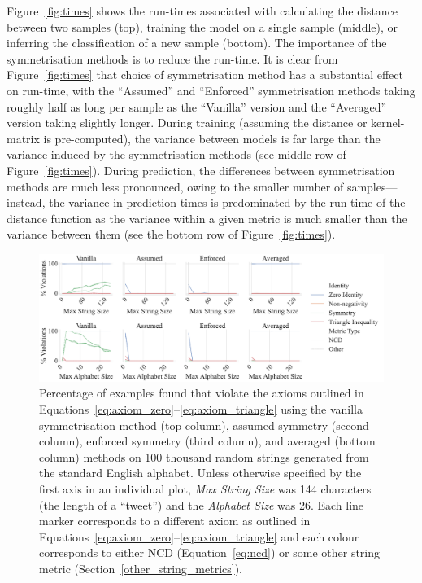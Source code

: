 \documentclass[preprint,12pt]{article}
\begin{document}
Figure~\ref{fig:times} shows the run-times associated with calculating the distance between two samples (top), training the model on a single sample (middle), or inferring the classification of a new sample (bottom).
The importance of the symmetrisation methods is to reduce the run-time.
It is clear from Figure~\ref{fig:times} that choice of symmetrisation method has a substantial effect on run-time, with the ``Assumed'' and ``Enforced'' symmetrisation methods taking roughly half as long per sample as the ``Vanilla'' version and the ``Averaged'' version taking slightly longer.
During training (assuming the distance or kernel-matrix is pre-computed), the variance between models is far large than the variance induced by the symmetrisation methods (see middle row of Figure~\ref{fig:times}).
During prediction, the differences between symmetrisation methods are much less pronounced, owing to the smaller number of samples---instead, the variance in prediction times is predominated by the run-time of the distance function as the variance within a given metric is much smaller than the variance between them (see the bottom row of Figure~\ref{fig:times}).

\begin{figure}[ht!]
    \centering
    \includegraphics[width=\textwidth]{images/synthetic_check.pdf}
    \caption{
    Percentage of examples found that violate the axioms outlined in Equations~\ref{eq:axiom_zero}--\ref{eq:axiom_triangle} using the vanilla symmetrisation method (top column), assumed symmetry (second column), enforced symmetry (third column), and averaged (bottom column) methods on 100 thousand random strings generated from the standard English alphabet.
    Unless otherwise specified by the first axis in an individual plot, \textit{Max String Size} was 144 characters (the length of a ``tweet'') and the \textit{Alphabet Size} was 26. Each line marker corresponds to a different axiom as outlined in Equations~\ref{eq:axiom_zero}--\ref{eq:axiom_triangle} and each colour corresponds to either NCD (Equation~\ref{eq:ncd}) or some other string metric (Section~\ref{other_string_metrics}).
    }
    \label{fig:synthetic_check}
\end{figure}
\end{document}
